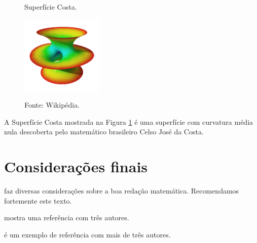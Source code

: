 \begin{figure}[H]
\begin{center}
\caption{Superfície Costa.}
\label{fig-exemplo}
\includegraphics[width=0.35\textwidth]{exemplo-fig}
\caption*{Fonte: Wikipédia\footnotemark.}
\end{center}
\end{figure}

A Superfície Costa mostrada na Figura \ref{fig-exemplo} é uma superfície com curvatura média nula descoberta pelo matemático brasileiro Celso José da Costa.

\chapter{Considerações finais}

 faz diversas considerações sobre a boa redação matemática. Recomendamos fortemente este texto.

 mostra uma referência com três autores. 

 é um exemplo de referência com mais de três autores. 







